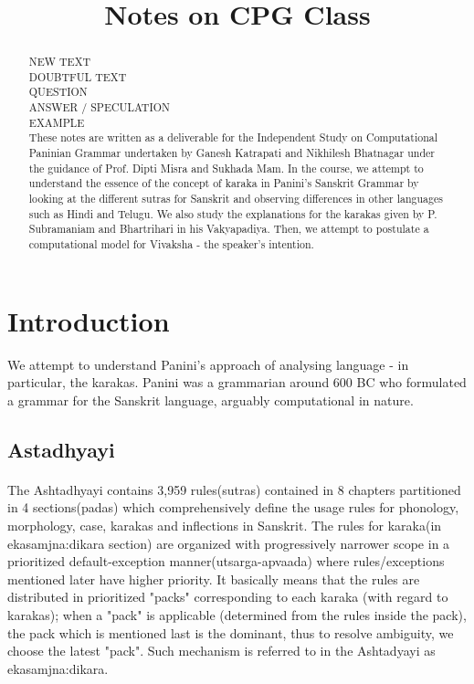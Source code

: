 \documentclass[a4paper,10pt]{article}
\title{Notes on CPG Class}
\author{}
\begin{document}
\maketitle

\newpage

\tableofcontents

\newpage

\begin{abstract}
\color{black!100}
NEW TEXT\\
\color{blue!100}
DOUBTFUL TEXT\\
\color{red!100}
QUESTION\\
\color{green!100}
ANSWER / SPECULATION\\
\color{purple!100}
EXAMPLE\\
\color{black!100}
These notes are written as a deliverable for the Independent Study on Computational Paninian Grammar undertaken by Ganesh Katrapati and Nikhilesh Bhatnagar under the guidance of Prof. Dipti Misra and Sukhada Mam. In the course, we attempt to understand the essence of the concept of karaka in Panini's Sanskrit Grammar by looking at the different sutras for Sanskrit and observing differences in other languages such as Hindi and Telugu. We also study the explanations for the karakas given by P. Subramaniam and Bhartrihari in his Vakyapadiya. Then, we attempt to postulate a computational model for Vivaksha - the speaker's intention.\\
\end{abstract}
\newpage
\section{Introduction}
\color{black!100}
We attempt to understand Panini's approach of analysing language - in particular, the karakas. Panini was a grammarian around 600 BC who formulated a grammar for the Sanskrit language, arguably computational in nature.
\subsection{Astadhyayi}
\paragraph{}The Ashtadhyayi contains 3,959 rules(sutras) contained in 8 chapters partitioned in 4 sections(padas) which comprehensively define the usage rules for phonology, morphology, case, karakas and inflections in Sanskrit. The rules for karaka(in ekasamjna:dikara section) are organized with progressively narrower scope in a prioritized default-exception manner(utsarga-apvaada) where rules/exceptions mentioned later have higher priority. It basically means that the rules are distributed in prioritized "packs" corresponding to each karaka (with regard to karakas); when a "pack" is applicable (determined from the rules inside the pack), the pack which is mentioned last is the dominant, thus to resolve ambiguity, we choose the latest "pack". Such mechanism is referred to in the Ashtadyayi as ekasamjna:dikara.
\end{document}
